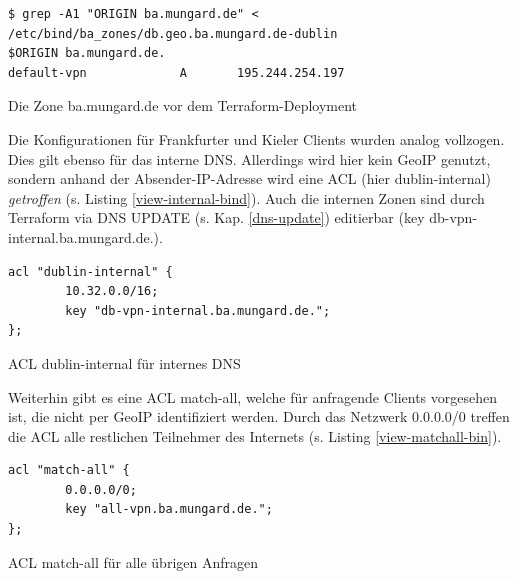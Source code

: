 \begin{listing}[h]
\begin{verbatim}
$ grep -A1 "ORIGIN ba.mungard.de" < /etc/bind/ba_zones/db.geo.ba.mungard.de-dublin
$ORIGIN ba.mungard.de.
default-vpn             A       195.244.254.197
\end{verbatim}
\caption{Die Zone ba.mungard.de vor dem Terraform-Deployment}
\label{zone-dublin-before-deployment}
\end{listing}\FloatBarrier
Die Konfigurationen für Frankfurter und Kieler \gls{Client}s wurden analog vollzogen. Dies gilt ebenso für das interne \gls{DNS}. Allerdings wird hier kein \gls{GeoIP} genutzt, sondern anhand der Absender-IP-Adresse wird eine \gls{ACL} (hier \glqq dublin-internal\grqq{}) \textit{getroffen} (s. Listing \ref{view-internal-bind}). Auch die internen Zonen sind durch Terraform via \gls{DNS} UPDATE (s. Kap. \ref{dns-update}) editierbar (key \glqq db-vpn-internal.ba.mungard.de.\grqq{}).
\begin{listing}[h]
\begin{verbatim}
acl "dublin-internal" {
        10.32.0.0/16;
        key "db-vpn-internal.ba.mungard.de.";
};
\end{verbatim}
\caption{ACL \glqq dublin-internal\grqq{} für internes DNS}
\label{view-internal-bind}
\end{listing}\FloatBarrier
Weiterhin gibt es eine \gls{ACL} \glqq match-all\grqq{}, welche für anfragende \gls{Client}s vorgesehen ist, die nicht per \gls{GeoIP} identifiziert werden. Durch das Netzwerk 0.0.0.0/0 treffen die \gls{ACL} alle restlichen Teilnehmer des Internets (s. Listing \ref{view-matchall-bin}).
\begin{listing}[h]
\begin{verbatim}
acl "match-all" {
        0.0.0.0/0;
        key "all-vpn.ba.mungard.de.";
};
\end{verbatim}
\caption{ACL \glqq match-all\grqq{} für alle übrigen Anfragen}
\label{view-matchall-bin}
\end{listing}\FloatBarrier

